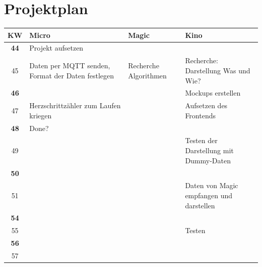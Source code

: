 \documentclass[a4paper, 11pt]{article}
\begin{document}
\section{Projektplan}
\begin{center}
\begin{tabularx}{\textwidth}{ |c|X|X|X| }
\hline
\textbf{KW} & \textbf{Micro} & \textbf{Magic} & \textbf{Kino} \\
\hline
\textbf{44}  & Projekt aufsetzen  &  &  \\
\hline
45  & Daten per MQTT senden, Format der Daten festlegen   & Recherche Algorithmen & Recherche: Darstellung Was und Wie?  \\
\hline
\textbf{46}  &   &  & Mockups erstellen  \\
\hline
47  & Herzschrittzähler zum Laufen kriegen   &  & Aufsetzen des Frontends  \\
\hline
\textbf{48}  & Done?  &  &  \\
\hline
49  &   &  & Testen der Darstellung mit Dummy-Daten \\
\hline
\textbf{50}  &   &  &  \\
\hline
51  &   &  & Daten von Magic empfangen und darstellen  \\
\hline
\textbf{54}  &   &  &  \\
\hline
55  &   &  & Testen  \\
\hline
\textbf{56}  &   &  &  \\
\hline
57  &   &  &  \\
\hline
\end{tabularx}
\end{center}
\clearpage
\end{document}
